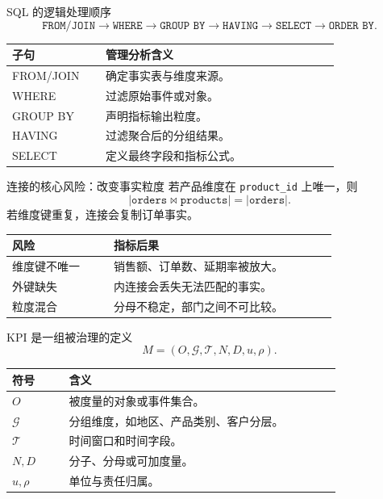 \documentclass[UTF8,fontset=fandol,aspectratio=169,11pt]{ctexbeamer}
\begin{document}
\begin{frame}{SQL 的逻辑处理顺序}
\[
\texttt{FROM/JOIN}
\rightarrow
\texttt{WHERE}
\rightarrow
\texttt{GROUP BY}
\rightarrow
\texttt{HAVING}
\rightarrow
\texttt{SELECT}
\rightarrow
\texttt{ORDER BY}.
\]

\begin{table}
\small
\centering
\begin{tabular}{p{0.24\linewidth}p{0.60\linewidth}}
\toprule
子句 & 管理分析含义\\
\midrule
FROM/JOIN & 确定事实表与维度来源。\\
WHERE & 过滤原始事件或对象。\\
GROUP BY & 声明指标输出粒度。\\
HAVING & 过滤聚合后的分组结果。\\
SELECT & 定义最终字段和指标公式。\\
\bottomrule
\end{tabular}
\end{table}
\end{frame}

\begin{frame}{连接的核心风险：改变事实粒度}
若产品维度在 \texttt{product\_id} 上唯一，则
\[
|\texttt{orders}\Join\texttt{products}|=|\texttt{orders}|.
\]
若维度键重复，连接会复制订单事实。

\begin{table}
\small
\centering
\begin{tabular}{p{0.25\linewidth}p{0.55\linewidth}}
\toprule
风险 & 指标后果\\
\midrule
维度键不唯一 & 销售额、订单数、延期率被放大。\\
外键缺失 & 内连接会丢失无法匹配的事实。\\
粒度混合 & 分母不稳定，部门之间不可比较。\\
\bottomrule
\end{tabular}
\end{table}
\end{frame}

\begin{frame}{KPI 是一组被治理的定义}
\[
M=(O,\mathcal G,\mathcal T,N,D,u,\rho).
\]

\begin{table}
\small
\centering
\begin{tabular}{p{0.14\linewidth}p{0.67\linewidth}}
\toprule
符号 & 含义\\
\midrule
\(O\) & 被度量的对象或事件集合。\\
\(\mathcal G\) & 分组维度，如地区、产品类别、客户分层。\\
\(\mathcal T\) & 时间窗口和时间字段。\\
\(N,D\) & 分子、分母或可加度量。\\
\(u,\rho\) & 单位与责任归属。\\
\bottomrule
\end{tabular}
\end{table}
\end{frame}
\end{document}
